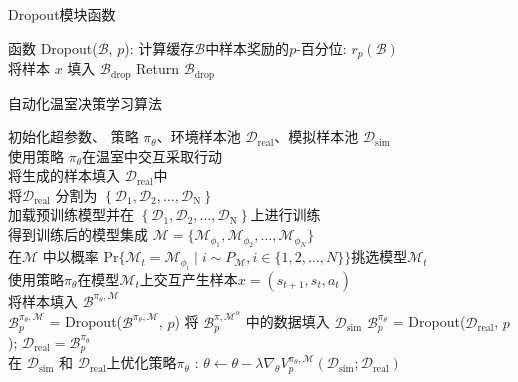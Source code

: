 \begin{algorithm}[t]
\caption{Dropout模块函数}
\begin{algorithmic}
\STATE 函数 Dropout($\mathcal{B}$, $p$):
    \STATE 计算缓存$\mathcal{B}$中样本奖励的$p$-百分位: $r_p(\mathcal{B})$\\
            \STATE 将样本 $x$ 填入 $\mathcal{B}_{\mathrm{drop}}$
        \ENDIF
    \ENDFOR
    \STATE Return $\mathcal{B}_{\mathrm{drop}}$
\end{algorithmic}
\end{algorithm}

\begin{algorithm}[t]
\caption{自动化温室决策学习算法}
\begin{algorithmic}
\STATE 初始化超参数、 策略 $\pi_\theta$、环境样本池 $\mathcal{D}_{\mathrm{real}}$、模拟样本池 $\mathcal{D}_{\mathrm{sim}}$\\
    \STATE 使用策略 $\pi_\theta$在温室中交互采取行动\\
    \STATE 将生成的样本填入 $\mathcal{D}_{\mathrm{real}}$中\\
    \STATE 将$\mathcal{D}_{\mathrm{real}}$ 分割为 $\left\{\mathcal{D}_{\mathrm{1}}, \mathcal{D}_{\mathrm{2}}, \ldots, \mathcal{D}_{\mathrm{N}}\right\}$\\
        \STATE 加载预训练模型并在 $\left\{\mathcal{D}_{\mathrm{1}}, \mathcal{D}_{\mathrm{2}}, \ldots, \mathcal{D}_{\mathrm{N}}\right\}$上进行训练\\
        \STATE 得到训练后的模型集成 $\mathcal{M} = \{\mathcal{M}_{\phi_1},\mathcal{M}_{\phi_2},\ldots,\mathcal{M}_{\phi_{N}}\}$\\
            \STATE 在$\mathcal{M}$ 中以概率 $\mathrm{Pr}\{\mathcal{M}_t=\mathcal{M}_{\phi_i}\mid i\sim P_{\mathcal{M}}, i\in\{1,2,\ldots,N\}\}$挑选模型$\mathcal{M}_t$\\
            \STATE 使用策略$\pi_\theta$在模型$\mathcal{M}_t$上交互产生样本$x=\left(s_{t+1},s_t,a_t\right)$ \\
            \STATE 将样本填入 $\mathcal{B}^{\pi_\theta,\mathcal{M}}$\\
        \ENDFOR
        \STATE $\mathcal{B}^{\pi_\theta,\mathcal{M}}_p$ = Dropout($\mathcal{B}^{\pi_\theta,\mathcal{M}}$, $p$)
        \STATE 将 $\mathcal{B}^{\pi,\mathcal{M}^\alpha}_p$ 中的数据填入 $\mathcal{D}_\mathrm{sim}$
    \ENDFOR
    \STATE $\mathcal{B}^{\pi_\theta}_p$ = Dropout($\mathcal{D}_{\mathrm{real}}$, $p$); $\mathcal{D}_{\mathrm{real}} = \mathcal{B}^{\pi_\theta}_p$\\
    \STATE 在 $\mathcal{D}_{\mathrm{sim}}$ 和 $\mathcal{D}_{\mathrm{real}}$上优化策略$\pi_\theta$ : $\theta\leftarrow \theta - \lambda\nabla_\theta V^{{\pi_\theta},\mathcal{M}}_p(\mathcal{D}_{\mathrm{sim}}; \mathcal{D}_{\mathrm{real}})$
\ENDFOR
\end{algorithmic}\label{algo:acml-method}
\end{algorithm}

